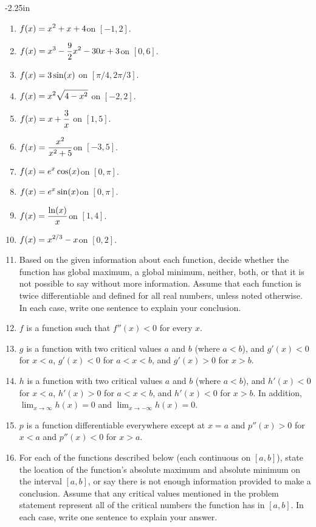 \begin{adjustwidth*}{}{-2.25in}
\begin{multicols*}{2}

\begin{enumerate}[1),resume]
\item $\displaystyle f(x) = x^2 + x + 4$\quad on \quad $[-1,2]$.
\item $\displaystyle f(x) = x^3 - \frac{9}{2}x^2 - 30 x + 3$\quad  on \quad $[0,6]$.
\item $\displaystyle f(x) = 3 \sin(x)$ \quad  on \quad $[\pi/4,2\pi/3]$.
\item $\displaystyle f(x) = x^2 \sqrt{4-x^2}$ \quad  on \quad $[-2,2]$.
\item $\displaystyle f(x) = x + \frac{3}{x}$ \quad  on \quad $[1,5]$.
\item $\displaystyle f(x) = \frac{x^2}{x^2 + 5}$\quad  on \quad $[-3,5]$.
\item $\displaystyle f(x) = e^x \cos(x)$\quad  on \quad $[0,\pi]$.
\item $\displaystyle f(x) = e^x \sin(x)$\quad  on \quad $[0,\pi]$.
\item $\displaystyle f(x) = \frac{\ln(x)}{x}$\quad  on \quad $[1,4]$.
\item $\displaystyle f(x) = x^{2/3} - x$\quad  on \quad $[0,2]$.

\item Based on the given information about each function, decide whether the function has global maximum, a global minimum, neither, both, or that it is not possible to say without more information.  Assume that each function is twice differentiable and defined for all real numbers, unless noted otherwise.  In each case, write one sentence to explain your conclusion.
	\ba
		\item $f$ is a function such that $f''(x) < 0$ for every $x$.
		\item $g$ is a function with two critical values $a$ and $b$ (where $a < b$), and $g'(x) < 0$ for $x < a$, $g'(x) < 0$ for $a < x < b$, and $g'(x) > 0$ for $x > b$.
		\item $h$ is a function with two critical values $a$ and $b$ (where $a < b$), and $h'(x) < 0$ for $x < a$, $h'(x) > 0$ for $a < x < b$, and $h'(x) < 0$ for $x > b$.  In addition, $\lim_{x \to \infty} h(x) = 0$ and $\lim_{x \to -\infty} h(x) = 0$.
		\item $p$ is a function differentiable everywhere except at $x = a$ and $p''(x) > 0$ for $x < a$ and $p''(x) < 0$ for $x > a$.
	\ea

\item For each of the functions described below (each continuous on $[a,b]$), state the location of the function's absolute maximum and absolute minimum on the interval $[a,b]$, or say there is not enough information provided to make a conclusion.  Assume that any critical values mentioned in the problem statement represent all of the critical numbers the function has in $[a,b]$.  In each case, write one sentence to explain your answer.


\end{enumerate}
\end{multicols*}
\end{adjustwidth*}
